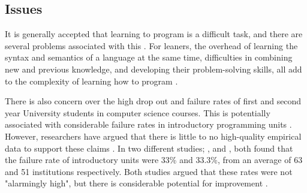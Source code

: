 \documentclass[a4paper,11.5pt]{report}
\numberwithin{figure}{section}
\numberwithin{table}{section}
\numberwithin{equation}{section}
\numberwithin{equation}{section}
\begin{document}




\subsection{Issues}


It is generally accepted that learning to program is a difficult task, and there are several problems associated with this \citep{Koulouri2014}. For leaners, the overhead of learning the syntax and semantics of a language at the same time, difficulties in combining new and previous knowledge, and developing their problem-solving skills, all add to the complexity of learning how to program \citep{Koulouri2014}.

There is also concern over the high drop out and failure rates of first and second year University students in computer science courses. This is potentially associated with considerable failure rates in introductory programming units \citep{Koulouri2014}. However, researchers have argued that there is little to no high-quality empirical data to support these claims \citep{bennedsen2007, watson2014}. In two different studies; \citet{bennedsen2007}, and \citet{watson2014}, both found that the failure rate of introductory units were 33\% and 33.3\%, from an average of 63 and 51 institutions respectively. Both studies argued that these rates were not "alarmingly high", but there is considerable potential for improvement \citep{watson2014}.
\end{document}
